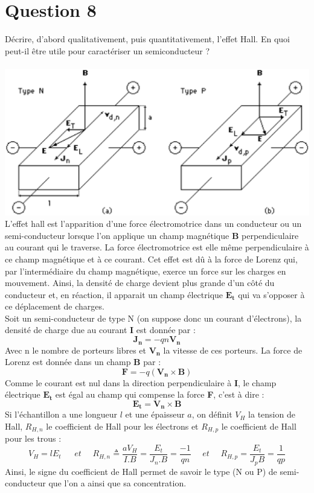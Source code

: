 \section{Question 8}
Décrire, d'abord qualitativement, puis quantitativement, l'effet Hall. En quoi peut-il être utile pour caractériser un semiconducteur ?
\\
\hbox{}
\\
\includegraphics[scale=0.3]{hall.eps} \\
L'effet hall est l'apparition d'une force électromotrice dans un conducteur ou un semi-conducteur lorsque l'on applique un champ magnétique $\mathbf{B}$ perpendiculaire au courant qui le traverse. La force électromotrice est elle même perpendiculaire à ce champ magnétique et à ce courant. Cet effet est dû à la force de Lorenz qui, par l'intermédiaire du champ magnétique, exerce un force sur les charges en mouvement. Ainsi, la densité de charge devient plus grande d'un côté du conducteur et, en réaction, il apparait un champ électrique $\mathbf{E_t} $ qui va s'opposer à ce déplacement de charges.\\
Soit un semi-conducteur de type N (on suppose donc un courant d'électrons), la densité de charge due au courant \textbf{I} est donnée par : 
\begin{equation}
\mathbf{J_n}=-qn\mathbf{V_n}
\end{equation}
Avec n le nombre de porteurs libres et $\mathbf{V_n}$ la vitesse de ces porteurs. La force de Lorenz est donnée dans un champ \textbf{B} par :
\begin{equation}
\textbf{F}=-q(\mathbf{V_n} \times \textbf{B})
\end{equation}
Comme le courant est nul dans la direction perpendiculaire à \textbf{I}, le champ électrique $\mathbf{E_t}$ est égal au champ qui compense la force \textbf{F}, c'est à dire :
\begin{equation}
\mathbf{E_t}=\mathbf{V_n} \times \textbf{B}
\end{equation}
Si l'échantillon a une longueur $l$ et une épaisseur $a$, on définit $V_H$ la tension de Hall, $R_{H,n}$ le coefficient de Hall pour les électrons et $R_{H,p}$ le coefficient de Hall pour les trous : 
\begin{equation}
V_H=lE_t ~~~~~~~et ~~~~~~ R_{H,n}\triangleq \frac{aV_H}{I.B} =\frac{E_t}{J_n.B}=\frac{-1}{qn} ~~~~~~ et ~~~~~~ R_{H,p}=\frac{E_t}{J_pB}=\frac{1}{qp}
\end{equation}
Ainsi, le signe du coefficient de Hall permet de savoir le type (N ou P) de semi-conducteur que l'on a ainsi que sa concentration.

